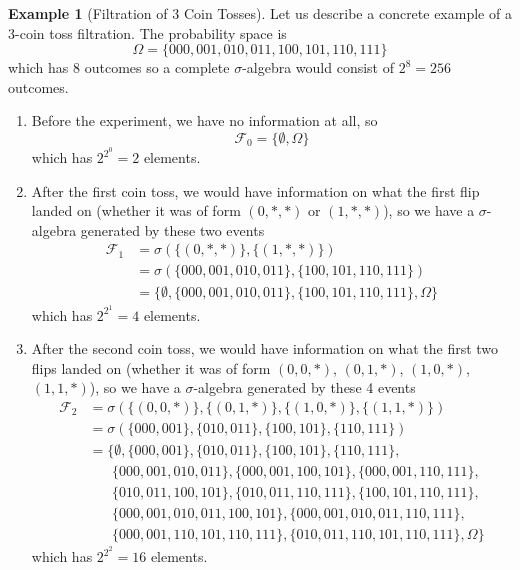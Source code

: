 \documentclass{article}
\theoremstyle{definition}
\newtheorem{example}{Example}[section]
\theoremstyle{remark}
\theoremstyle{definition}
\begin{document}
\begin{example}[Filtration of 3 Coin Tosses]
Let us describe a concrete example of a 3-coin toss filtration. The probability space is 
\[\Omega = \{000, 001, 010, 011, 100, 101, 110, 111\}\]
which has $8$ outcomes so a complete $\sigma$-algebra would consist of $2^8 = 256$ outcomes. 
\begin{enumerate}
    \item Before the experiment, we have no information at all, so 
    \[\mathcal{F}_0 = \{\emptyset, \Omega\}\]
    which has $2^{2^0} = 2$ elements. 
    
    \item After the first coin toss, we would have information on what the first flip landed on (whether it was of form $( 0, \ast, \ast)$ or $(1, \ast, \ast)$), so we have a $\sigma$-algebra generated by these two events 
    \begin{align*}
        \mathcal{F}_1 & = \sigma(\{( 0, \ast, \ast)\}, \{(1, \ast, \ast)\}) \\
        & = \sigma(\{000, 001, 010, 011\}, \{100, 101, 110, 111\}) \\
        & = \{\emptyset, \{000, 001, 010, 011\}, \{100, 101, 110, 111\}, \Omega\}
    \end{align*}
    which has $2^{2^1} = 4$ elements. 
    
    \item After the second coin toss, we would have information on what the first two flips landed on (whether it was of form $( 0, 0, \ast)$, $( 0, 1, \ast)$, $(1, 0, \ast)$, $(1, 1, \ast)$), so we have a $\sigma$-algebra generated by these 4 events 
    \begin{align*}
        \mathcal{F}_2 & = \sigma(\{( 0, 0, \ast)\}, \{( 0, 1, \ast)\}, \{(1, 0, \ast)\}, \{(1, 1, \ast)\}) \\
        & = \sigma(\{000, 001\}, \{010, 011\}, \{100, 101\}, \{110, 111\}) \\
        & = \{\emptyset, \{000, 001\}, \{010, 011\}, \{100, 101\}, \{110, 111\}, \\
        & \;\;\;\;\;\; \{000, 001, 010, 011\}, \{000, 001, 100, 101\}, \{000, 001, 110, 111\}, \\
        & \;\;\;\;\;\; \{010, 011, 100, 101\}, \{010, 011, 110, 111\}, \{100, 101, 110, 111\}, \\ 
        & \;\;\;\;\;\; \{000, 001, 010, 011, 100, 101\}, \{000, 001, 010, 011, 110, 111\}, \\
        & \;\;\;\;\;\; \{000, 001, 110, 101, 110, 111\}, \{010, 011, 110, 101, 110, 111\},  \Omega\}
    \end{align*}
    which has $2^{2^2} = 16$ elements. 
    

\end{enumerate}
\end{example}
\end{document}
